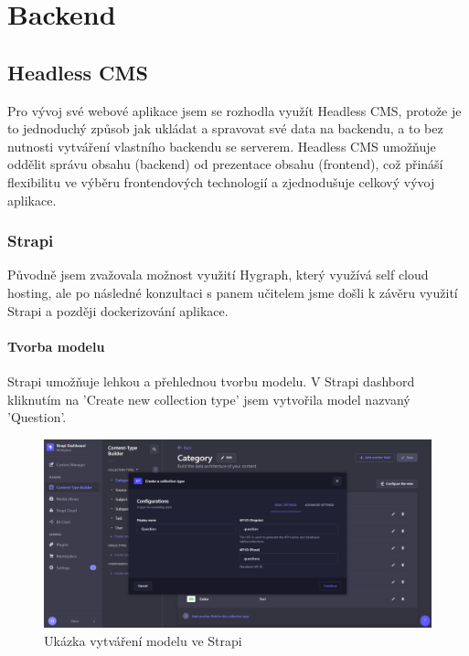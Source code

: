 \documentclass[12pt, a4paper,
oneside,      %
openright
]{report}
\let\oldchapter\chapter
\renewcommand{\chapter}{
	\clearpage %
	\pagestyle{plain} %
	\oldchapter	
}
\begin{document}


\chapter{Backend}
\label{sec:backend}

\section{Headless CMS}
\label{sec:headlessCMS}
Pro vývoj své webové aplikace jsem se rozhodla využít Headless CMS, protože je to jednoduchý způsob jak ukládat a spravovat své data na backendu, a to bez nutnosti vytváření vlastního backendu se serverem. Headless CMS umožňuje oddělit správu obsahu (backend) od prezentace obsahu (frontend), což přináší flexibilitu ve výběru frontendových technologií a zjednodušuje celkový vývoj aplikace.

\subsection{Strapi}
Původně jsem zvažovala možnost využití Hygraph, který využívá self cloud hosting, ale po následné konzultaci s panem učitelem jsme došli k závěru využití Strapi a později dockerizování aplikace.

\subsubsection{Tvorba modelu}
Strapi umožňuje lehkou a přehlednou tvorbu modelu. V Strapi dashbord kliknutím na 'Create new collection type' jsem vytvořila model nazvaný 'Question'. 

\vspace{10pt}

\begin{figure}[h]
	\centering
	\includegraphics[width=0.8\linewidth]{image/strapi-question.png} 
	\caption{Ukázka vytváření modelu ve Strapi}
\end{figure}
\end{document}
